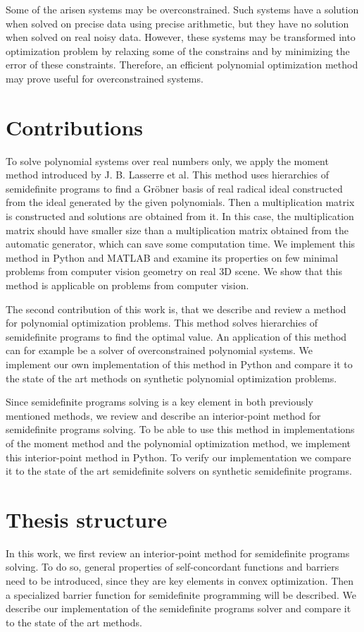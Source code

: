 Some of the arisen systems may be overconstrained.
Such systems have a solution when solved on precise data using precise arithmetic, but they have no solution when solved on real noisy data.
However, these systems may be transformed into optimization problem by relaxing some of the constrains and by minimizing the error of these constraints.
Therefore, an efficient polynomial optimization method may prove useful for overconstrained systems.

\section{Contributions}
To solve polynomial systems over real numbers only, we apply the moment method introduced by J. B. Lasserre et al.
This method uses hierarchies of semidefinite programs to find a Gr\"obner basis of real radical ideal constructed from the ideal generated by the given polynomials.
Then a multiplication matrix is constructed and solutions are obtained from it.
In this case, the multiplication matrix should have smaller size than a multiplication matrix obtained from the automatic generator, which can save some computation time.
We implement this method in Python and MATLAB and examine its properties on few minimal problems from computer vision geometry on real 3D scene.
We show that this method is applicable on problems from computer vision.

The second contribution of this work is, that we describe and review a method for polynomial optimization problems.
This method solves hierarchies of semidefinite programs to find the optimal value.
An application of this method can for example be a solver of overconstrained polynomial systems.
We implement our own implementation of this method in Python and compare it to the state of the art methods on synthetic polynomial optimization problems.

Since semidefinite programs solving is a key element in both previously mentioned methods, we review and describe an interior-point method for semidefinite programs solving.
To be able to use this method in implementations of the moment method and the polynomial optimization method, we implement this interior-point method in Python.
To verify our implementation we compare it to the state of the art semidefinite solvers on synthetic semidefinite programs.

\section{Thesis structure}
In this work, we first review an interior-point method for semidefinite programs solving.
To do so, general properties of self-concordant functions and barriers need to be introduced, since they are key elements in convex optimization.
Then a specialized barrier function for semidefinite programming will be described.
We describe our implementation of the semidefinite programs solver and compare it to the state of the art methods.

